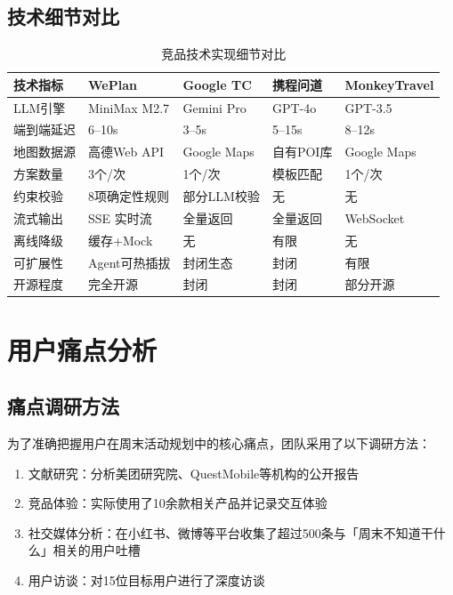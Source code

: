\documentclass[12pt,a4paper]{ctexart}
\begin{document}
\subsection{技术细节对比}

\begin{table}[H]
\centering
\caption{竞品技术实现细节对比}
\label{tab:tech-detail-compare}
\renewcommand{\arraystretch}{1.3}
\small
\begin{tabularx}{\textwidth}{>{\raggedright}p{2.5cm}XXXX}
\toprule
\textbf{技术指标} & \textbf{WePlan} & \textbf{Google TC} & \textbf{携程问道} & \textbf{MonkeyTravel} \\
\midrule
LLM引擎 & MiniMax M2.7 & Gemini Pro & GPT-4o & GPT-3.5 \\
端到端延迟 & 6--10s & 3--5s & 5--15s & 8--12s \\
地图数据源 & 高德Web API & Google Maps & 自有POI库 & Google Maps \\
方案数量 & 3个/次 & 1个/次 & 模板匹配 & 1个/次 \\
约束校验 & 8项确定性规则 & 部分LLM校验 & 无 & 无 \\
流式输出 & SSE 实时流 & 全量返回 & 全量返回 & WebSocket \\
离线降级 & 缓存+Mock & 无 & 有限 & 无 \\
可扩展性 & Agent可热插拔 & 封闭生态 & 封闭 & 有限 \\
开源程度 & 完全开源 & 封闭 & 封闭 & 部分开源 \\
\bottomrule
\end{tabularx}
\end{table}

\newpage

\section{用户痛点分析}

\subsection{痛点调研方法}

为了准确把握用户在周末活动规划中的核心痛点，团队采用了以下调研方法：

\begin{enumerate}[leftmargin=2em]
  \item 文献研究：分析美团研究院、QuestMobile等机构的公开报告
  \item 竞品体验：实际使用了10余款相关产品并记录交互体验
  \item 社交媒体分析：在小红书、微博等平台收集了超过500条与「周末不知道干什么」相关的用户吐槽
  \item 用户访谈：对15位目标用户进行了深度访谈
\end{enumerate}
\end{document}
